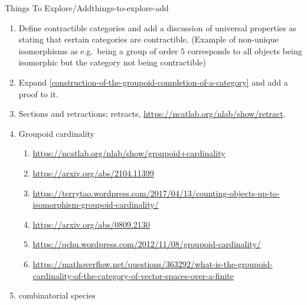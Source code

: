 \begin{remark}{Things To Explore/Add}{things-to-explore-add}
\begin{enumerate}
            \begin{enumerate}
                \item Dihedral and symmetric nerves of categories via groupoids (define them first for groupoids and then Kan extend along $\Grpd\hookrightarrow\Cats$)
                    \begin{enumerate}
                        \item Same applies to twisted nerves
                    \end{enumerate}
                \item Cyclic nerve of a category
                \item Crossed Simplicial Group Categorical Nerves, \url{https://arxiv.org/abs/1603.08768}
            \end{enumerate}
        \item Define contractible categories and add a discussion of universal properties as stating that certain categories are contractible. (Example of non-unique isomorphisms as e.g.\ being a group of order $5$ corresponds to all objects being isomorphic but the category not being contractible)
        \item Expand \cref{construction-of-the-groupoid-completion-of-a-category} and add a proof to it.
        \item Sections and retractions; retracts, \url{https://ncatlab.org/nlab/show/retract}.
        \item Groupoid cardinality
            \begin{enumerate}
                \item \url{https://ncatlab.org/nlab/show/groupoid+cardinality}
                \item \url{https://arxiv.org/abs/2104.11399}
                \item \url{https://terrytao.wordpress.com/2017/04/13/counting-objects-up-to-isomorphism-groupoid-cardinality/}
                \item \url{https://arxiv.org/abs/0809.2130}
                \item \url{https://qchu.wordpress.com/2012/11/08/groupoid-cardinality/}
                \item \url{https://mathoverflow.net/questions/363292/what-is-the-groupoid-cardinality-of-the-category-of-vector-spaces-over-a-finite}
            \end{enumerate}
        \item combinatorial species
            \begin{enumerate}

\end{enumerate}
\end{enumerate}
\end{remark}
